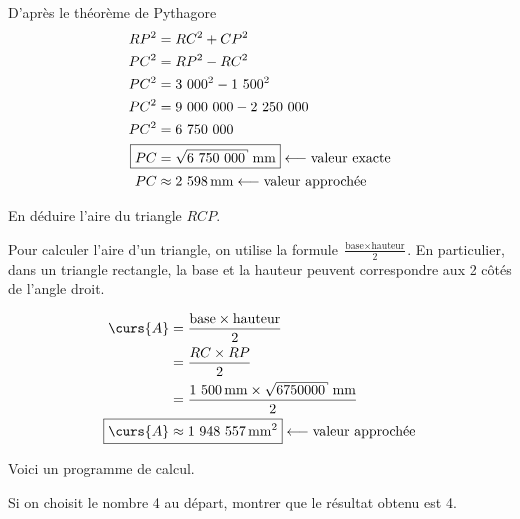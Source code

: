 \documentclass[../Cours.tex]{subfiles}
\begin{document}
\begin{questions}
{D'après le théorème de Pythagore
\begin{align*}
    RP^2 &= RC^2 + CP^2 \\
    PC^2 &= RP^2 - RC^2 \\
    PC^2 &= \num{3000}^2 - \num{1500}^2 \\
    PC^2 &= \num{9000000} - \num{2250000} \\
    PC^2 &= \num{6750000} \\
    \Aboxed{PC &= \sqrt{\num{6750000}}~\unit{\milli\metre}} \longleftarrow \mbox{valeur exacte} \\
    PC &\approx \qty{2598}{\milli\metre} \longleftarrow \mbox{valeur approchée}
\end{align*}
}

\question En déduire l'aire du triangle $RCP$.

{\color{rouge}
\begin{mdframed}
    Pour calculer l'aire d'un triangle, on utilise la formule $\frac{\mbox{base} \times \mbox{hauteur}}{2}$. 
    En particulier, dans un triangle rectangle, la base et la hauteur peuvent correspondre aux 2 côtés de l'angle droit. 
\end{mdframed}
\begin{align*}
    \curs{A} &= \frac{\mbox{base} \times \mbox{hauteur}}{2} \\
    &= \frac{RC \times RP}{2} \\ 
    &= \frac{\qty{1500}{\milli\metre} \times \sqrt{6750000}~\unit{\milli\metre} }{2} \\ 
    \Aboxed{\curs{A}&\approx \qty{1948557}{\milli\metre\squared}} \longleftarrow \mbox{valeur approchée}\\ 
\end{align*}
}


\exercice
Voici un programme de calcul.

\begin{center}
\end{center}

\question Si on choisit le nombre 4 au départ, montrer que le résultat obtenu est 4.


\end{questions}
\end{document}
